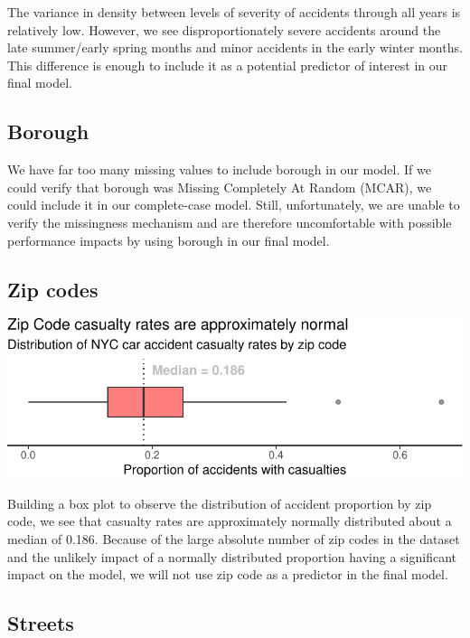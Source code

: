 \documentclass[
  letterpaper,
  DIV=11,
  numbers=noendperiod]{scrartcl}
\begin{document}
The variance in density between levels of severity of accidents through
all years is relatively low. However, we see disproportionately severe
accidents around the late summer/early spring months and minor accidents
in the early winter months. This difference is enough to include it as a
potential predictor of interest in our final model.

\hypertarget{borough}{%
\subsection{Borough}\label{borough}}

We have far too many missing values to include borough in our model. If
we could verify that borough was Missing Completely At Random (MCAR), we
could include it in our complete-case model. Still, unfortunately, we
are unable to verify the missingness mechanism and are therefore
uncomfortable with possible performance impacts by using borough in our
final model.

\hypertarget{zip-codes}{%
\subsection{Zip codes}\label{zip-codes}}

\includegraphics{project_files/figure-pdf/viz-zip-code-box-1.pdf}

Building a box plot to observe the distribution of accident proportion
by zip code, we see that casualty rates are approximately normally
distributed about a median of 0.186. Because of the large absolute
number of zip codes in the dataset and the unlikely impact of a normally
distributed proportion having a significant impact on the model, we will
not use zip code as a predictor in the final model.

\hypertarget{streets}{%
\subsection{Streets}\label{streets}}
\end{document}
